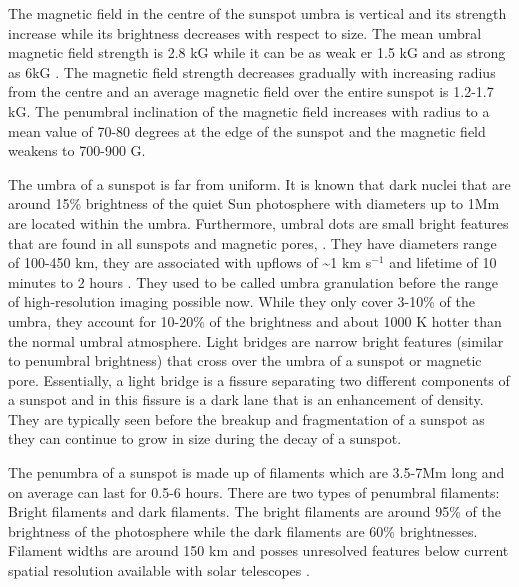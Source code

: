 	The magnetic field in the centre of the sunspot umbra is vertical and its strength increase while its brightness decreases with respect to size.
	The mean umbral magnetic field strength is 2.8 kG while it can be as weak er 1.5 kG and as strong as 6kG \citep{2006SoPh..239...41L}.
	The magnetic field strength decreases gradually with increasing radius from the centre and an average magnetic field over the entire sunspot is 1.2-1.7 kG.
	The penumbral inclination of the magnetic field increases with radius to a mean value of 70-80 degrees at the edge of the sunspot and the magnetic field weakens to 700-900 G.

	The umbra of a sunspot is far from uniform.
	It is known that dark nuclei that are around 15\% brightness of the quiet Sun photosphere with diameters up to 1Mm are located within the umbra.
	Furthermore, umbral dots are small bright features that are found in all sunspots and magnetic pores, \cite{1950Obs....70..234T,1964ApJ...139...45D}.
	They have diameters range of 100-450 km, they are associated with upflows of \textasciitilde1 km s$^{-1}$ and lifetime of 10 minutes to 2 hours \citep{1997A&A...328..682S,1997A&A...328..689S}.
	They used to be called umbra granulation before the range of high-resolution imaging possible now.
	While they only cover 3-10\% of the umbra, they account for 10-20\% of the brightness and about 1000 K hotter than the normal umbral atmosphere.
	Light bridges are narrow bright features (similar to penumbral brightness) that cross over the umbra of a sunspot or magnetic pore.
	Essentially, a light bridge is a fissure separating two different components of a sunspot and in this fissure is a dark lane that is an enhancement of density.
	They are typically seen before the breakup and fragmentation of a sunspot as they can continue to grow in size during the decay of a sunspot.
	
	The penumbra of a sunspot is made up of filaments which are 3.5-7Mm long and on average can last for 0.5-6 hours.
	There are two types of penumbral filaments: Bright filaments and dark filaments.
	The bright filaments are around 95\% of the brightness of the photosphere while the dark filaments are 60\% brightnesses.
	Filament widths are around 150 km and posses unresolved features below current spatial resolution available with solar telescopes \citep{2002Natur.420..151S,2011Sci...333..316S}.
	
